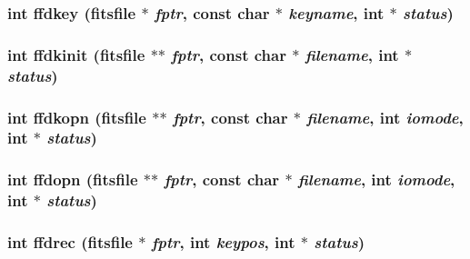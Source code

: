 \subsubsection{\setlength{\rightskip}{0pt plus 5cm}int ffdkey (\bf{fitsfile} $\ast$ {\em fptr}, const char $\ast$ {\em keyname}, int $\ast$ {\em status})}\label{src_2fitsio_8h_c07173729eb0c7f54c9b10e14dcc581f}


\subsubsection{\setlength{\rightskip}{0pt plus 5cm}int ffdkinit (\bf{fitsfile} $\ast$$\ast$ {\em fptr}, const char $\ast$ {\em filename}, int $\ast$ {\em status})}\label{src_2fitsio_8h_9d80b85b1dd87a39313c42076dfccdcc}


\subsubsection{\setlength{\rightskip}{0pt plus 5cm}int ffdkopn (\bf{fitsfile} $\ast$$\ast$ {\em fptr}, const char $\ast$ {\em filename}, int {\em iomode}, int $\ast$ {\em status})}\label{src_2fitsio_8h_891bfcf028003e840a9f554842123fce}


\subsubsection{\setlength{\rightskip}{0pt plus 5cm}int ffdopn (\bf{fitsfile} $\ast$$\ast$ {\em fptr}, const char $\ast$ {\em filename}, int {\em iomode}, int $\ast$ {\em status})}\label{src_2fitsio_8h_2bf742ed269ae35cef1f7ddfc146ccb3}


\subsubsection{\setlength{\rightskip}{0pt plus 5cm}int ffdrec (\bf{fitsfile} $\ast$ {\em fptr}, int {\em keypos}, int $\ast$ {\em status})}\label{src_2fitsio_8h_a0470408dc45f3c4b0d813f8558b6afc}


